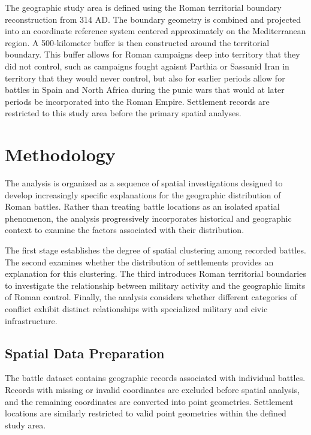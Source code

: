 \documentclass[
  letterpaper,
  DIV=11,
  numbers=noendperiod]{scrartcl}
\begin{document}
The geographic study area is defined using the Roman territorial
boundary reconstruction from 314 AD. The boundary geometry is combined
and projected into an coordinate reference system centered approximately
on the Mediterranean region. A 500-kilometer buffer is then constructed
around the territorial boundary. This buffer allows for Roman campaigns
deep into territory that they did not control, such as campaigns fought
agaisnt Parthia or Sassanid Iran in territory that they would never
control, but also for earlier periods allow for battles in Spain and
North Africa during the punic wars that would at later periods be
incorporated into the Roman Empire. Settlement records are restricted to
this study area before the primary spatial analyses.

\section{Methodology}\label{methodology}

The analysis is organized as a sequence of spatial investigations
designed to develop increasingly specific explanations for the
geographic distribution of Roman battles. Rather than treating battle
locations as an isolated spatial phenomenon, the analysis progressively
incorporates historical and geographic context to examine the factors
associated with their distribution.

The first stage establishes the degree of spatial clustering among
recorded battles. The second examines whether the distribution of
settlements provides an explanation for this clustering. The third
introduces Roman territorial boundaries to investigate the relationship
between military activity and the geographic limits of Roman control.
Finally, the analysis considers whether different categories of conflict
exhibit distinct relationships with specialized military and civic
infrastructure.

\subsection{Spatial Data Preparation}\label{spatial-data-preparation}

The battle dataset contains geographic records associated with
individual battles. Records with missing or invalid coordinates are
excluded before spatial analysis, and the remaining coordinates are
converted into point geometries. Settlement locations are similarly
restricted to valid point geometries within the defined study area.
\end{document}
